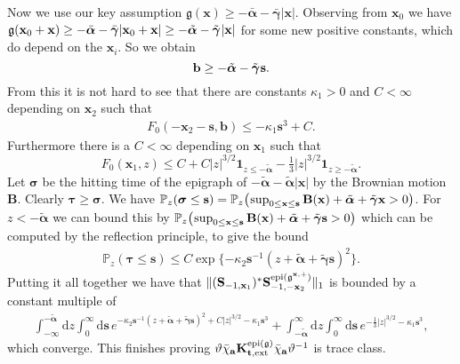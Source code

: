 \documentclass[letterpaper,reqno,11pt,oneside,final]{amsart}
\theoremstyle{definition}
\newcommand{\fg}{\mathfrak{g}}
\newcommand{\fb}{\mathbf{b}}
\newcommand{\pp}{\mathbb{P}}
\newcommand{\uno}[1]{\mathbf{1}_{#1}}
\newcommand{\tts}{\hspace{0.05em}}
\newcommand{\tsm}{\hspace{-0.1em}}
\newcommand{\uptext}[1]{\text{\upshape{#1}}}
\DeclareMathOperator{\epi}{\uptext{epi}}
\renewcommand{\d}{\mathrm{d}}
\newcommand{\fT}{\mathbf{S}}
\newcommand{\ft}{\mathbf{t}}
\newcommand{\fs}{\mathbf{s}}
\newcommand{\fx}{\mathbf{x}}
\newcommand{\fa}{\mathbf{a}}
\newcommand{\fB}{\mathbf{B}}
\newcommand{\fK}{\mathbf{K}}
\newcommand{\ftau}{\bm{\tau}}
\newcommand{\gga}{\bar{\bm{\alpha}}}
\newcommand{\g}{\bar{\bm{\gamma}}}
\newcommand{\fsigma}{\bm{\sigma}}
\renewcommand{\P}{\chi}
\numberwithin{equation}{section}
\begin{document}
Now we use our key assumption $\fg(\fx)\ge -\gga - \g |\fx|$.  Observing from $\fx_0$ we have $\fg(\fx_0+\fx) \ge  -\gga - \g |\fx_0+\fx| \ge   -{\tilde{\bm{\alpha}}}- {\tilde{\bm{\gamma}}}\tts|\fx|$ for some new positive constants, which do depend on the $\fx_i$.  So we obtain 
\begin{equation}\label{eq:A4}
\fb\ge  -{\tilde{\bm{\alpha}}}- {\tilde{\bm{\gamma}}}\tts\fs.
\end{equation}
From this it is not hard to see that there are constants $\kappa_1>0$ and $C<\infty$ depending on $\fx_2$ such that 
\begin{align}\label{eq:A5}
{F}_0(-\fx_2-\fs ,\fb)\le -\kappa_1 \fs^3 + C.
\end{align}Furthermore there is a $C<\infty$ depending on $\fx_1$ such that 
\begin{equation}\label{eq:A6}
{F}_0(\fx_1 ,z)\le C + C|z|^{3/2} \uno{z\le -{\tilde{\bm{\alpha}}}} -\tfrac13 |z|^{3/2}
 \uno{z\ge -{\tilde{\bm{\alpha}}}}.
\end{equation}
Let $\fsigma$ be the hitting time of  the epigraph of $-{\tilde{\bm{\alpha}}}-{\tilde{\bm{\alpha}}}|\fx|$ by the Brownian motion  $\fB$. Clearly $\ftau\ge \fsigma$.
We have $\pp_z( \fsigma\le \fs) = \pp_z\big(\tsm\sup_{0\le \fx\le \fs} \fB(\fx) + {\tilde{\bm{\alpha}}}+ {\tilde{\bm{\gamma}}}\fx>0\big)$.
For $z<- {\tilde{\bm{\alpha}}}$ we can bound this by $\pp_z\big(\tsm\sup_{0\le \fx\le \fs} \fB(\fx) + {\tilde{\bm{\alpha}}}+ {\tilde{\bm{\gamma}}}\fs>0\big)$ which can be computed by the reflection principle, to give the bound
\begin{align}\label{}
\pp_z( \ftau\le \fs)\le C\exp\{- \kappa_2 \fs^{-1} (z+{\tilde{\bm{\alpha}}}+{\tilde{\bm{\gamma}}}\fs)^2 \}. 
\end{align}
Putting it all together we have that $\|( \fT_{-1,\fx_1} )^* \fT^{\epi(\fg^{\fx,+})}_{-1,-\fx_2}\|_1$ is bounded by a constant multiple of 
\begin{align}
 \int^{- {\tilde{\bm{\alpha}}}}_{-\infty}\d z \int_0^\infty\d\fs \, e^{ - \kappa_2 \fs^{-1} (z+{\tilde{\bm{\alpha}}}+{\tilde{\bm{\gamma}}}\fs)^2 + C|z|^{3/2} -\kappa_1\fs^3 }
+\int_{- {\tilde{\bm{\alpha}}}}^{\infty}\d z \int_0^\infty\d\fs \, e^{ -\frac13|z|^{3/2} -\kappa_1\fs^3 },
\end{align}
which converge.
This finishes proving $\vartheta\bar\P_\fa\fK^{\epi(\fg)}_{\ft,\uptext{ext}}\bar\P_\fa\vartheta^{-1}$ is trace class.
\end{document}

